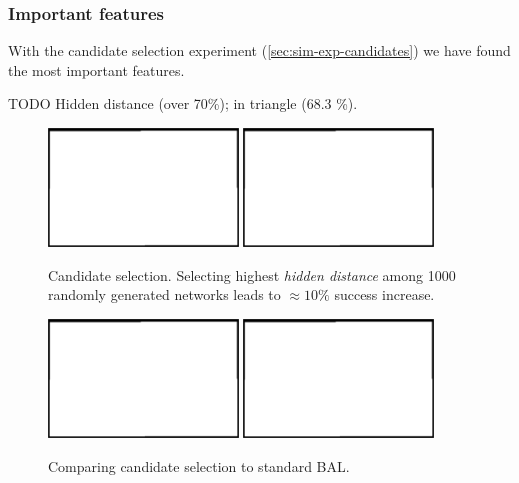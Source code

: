 
\subsubsection{Important features}
\label{sec:results-candidates} 

With the candidate selection experiment (\ref{sec:sim-exp-candidates}) we have found the most important features. 

TODO Hidden distance (over 70\%); in triangle (68.3 \%). \\


\begin{figure}[H]
  \centering
  \includegraphics[width=0.45\textwidth]{img/placeholder.png}  %
  \includegraphics[width=0.45\textwidth]{img/placeholder.png}  %
  \caption{Candidate selection. Selecting highest \emph{hidden distance} among 1000 randomly generated networks leads to $\approx 10\%$ success increase.}
  \label{fig:results-candidates-tlr}
\end{figure}


\begin{figure}[H]
  \centering
  \includegraphics[width=0.45\textwidth]{img/placeholder.png}  %
  \includegraphics[width=0.45\textwidth]{img/placeholder.png}  %
  \caption{Comparing candidate selection to standard BAL.}
  \label{fig:results-candidates-epoch}
\end{figure}

